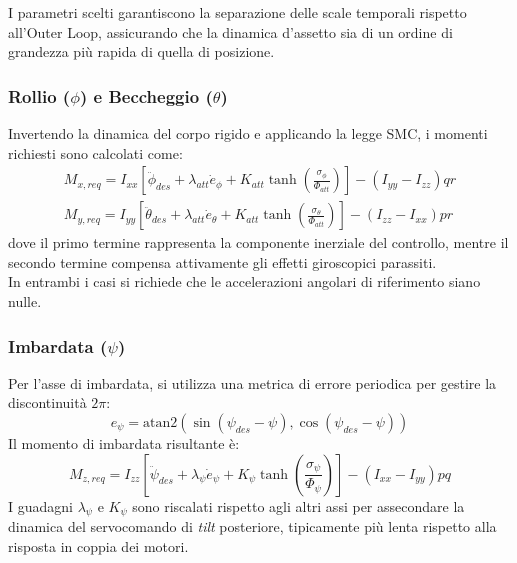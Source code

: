 I parametri scelti garantiscono la separazione delle scale temporali rispetto all'Outer Loop, assicurando che la dinamica d'assetto sia di un ordine di grandezza più rapida di quella di posizione.

\subsubsection{Rollio ($\phi$) e Beccheggio ($\theta$)}
Invertendo la dinamica del corpo rigido e applicando la legge SMC, i momenti richiesti sono calcolati come:
\begin{align}
    M_{x,req} = I_{xx} \left[ \ddot{\phi}_{des} + \lambda_{att} \dot{e}_\phi + K_{att} \tanh\left( \frac{\sigma_\phi}{\Phi_{att}} \right) \right] - (I_{yy} - I_{zz})qr \\
    M_{y,req} = I_{yy} \left[ \ddot{\theta}_{des} + \lambda_{att} \dot{e}_\theta + K_{att} \tanh\left( \frac{\sigma_\theta}{\Phi_{att}} \right) \right] - (I_{zz} - I_{xx})pr
\end{align}
dove il primo termine rappresenta la componente inerziale del controllo, mentre il secondo termine compensa attivamente gli effetti giroscopici parassiti.
\\In entrambi i casi si richiede che le accelerazioni angolari di riferimento siano nulle.

\subsubsection{Imbardata ($\psi$)}
Per l'asse di imbardata, si utilizza una metrica di errore periodica per gestire la discontinuità $2\pi$:
\begin{equation}
    e_\psi = \text{atan2}(\sin(\psi_{des} - \psi), \cos(\psi_{des} - \psi))
\end{equation}
Il momento di imbardata risultante è:
\begin{equation}
    M_{z,req} = I_{zz} \left[ \ddot{\psi}_{des} + \lambda_\psi \dot{e}_\psi + K_\psi \tanh\left( \frac{\sigma_\psi}{\Phi_{\psi}} \right) \right] - (I_{xx} - I_{yy})pq
\end{equation}
I guadagni $\lambda_\psi$ e $K_\psi$ sono riscalati rispetto agli altri assi per assecondare la dinamica del servocomando di \textit{tilt} posteriore, tipicamente più lenta rispetto alla risposta in coppia dei motori.
\clearpage

